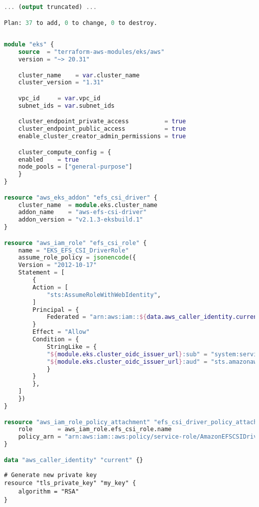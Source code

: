 \begin{appendices}
\begin{lstlisting}[language=Terraform, caption={Terraform Plan Output}, label={lst:terraform_plan}]
... (output truncated) ...

Plan: 37 to add, 0 to change, 0 to destroy.
    
\end{lstlisting}

\begin{lstlisting}[language=Terraform, caption={Terraform Configuration for Creating EFS CSI Driver}, label={lst:efs_csi_driver},breaklines=true]
module "eks" {
    source  = "terraform-aws-modules/eks/aws"
    version = "~> 20.31"

    cluster_name    = var.cluster_name
    cluster_version = "1.31"

    vpc_id     = var.vpc_id
    subnet_ids = var.subnet_ids

    cluster_endpoint_private_access          = true
    cluster_endpoint_public_access           = true
    enable_cluster_creator_admin_permissions = true

    cluster_compute_config = {
    enabled    = true
    node_pools = ["general-purpose"]
    }
}

resource "aws_eks_addon" "efs_csi_driver" {
    cluster_name  = module.eks.cluster_name
    addon_name    = "aws-efs-csi-driver"
    addon_version = "v2.1.3-eksbuild.1"
}

resource "aws_iam_role" "efs_csi_role" {
    name = "EKS_EFS_CSI_DriverRole"
    assume_role_policy = jsonencode({
    Version = "2012-10-17"
    Statement = [
        {
        Action = [
            "sts:AssumeRoleWithWebIdentity",
        ]
        Principal = {
            Federated = "arn:aws:iam::${data.aws_caller_identity.current.account_id}: oidc-provider/${module.eks.cluster_oidc_issuer_url}"
        }
        Effect = "Allow"
        Condition = {
            StringLike = {
            "${module.eks.cluster_oidc_issuer_url}:sub" = "system:serviceaccount:kube-system:efs-csi-*",
            "${module.eks.cluster_oidc_issuer_url}:aud" = "sts.amazonaws.com"
            }
        }
        },
    ]
    })
}

resource "aws_iam_role_policy_attachment" "efs_csi_driver_policy_attachment" {
    role       = aws_iam_role.efs_csi_role.name
    policy_arn = "arn:aws:iam::aws:policy/service-role/AmazonEFSCSIDriverPolicy"
}

data "aws_caller_identity" "current" {}
\end{lstlisting}

\begin{lstlisting}[caption={Terraform Configuration for Setting Up EC2 Instance}, label={lst:ec2_setup}]
# Generate new private key
resource "tls_private_key" "my_key" {
    algorithm = "RSA"
}


\end{lstlisting}
\end{appendices}
